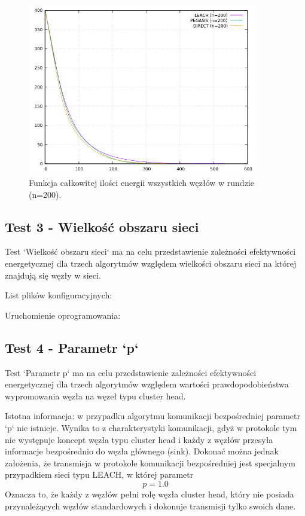 \documentclass[a4paper,12pt,twoside,openany]{report}
\begin{document}
\begin{figure}[H]
 \centering
 \includegraphics[width=10cm]{images/gnuplot/test_2/energy_in_round_200.png}
 \caption{Funkcja całkowitej ilości energii wszystkich węzłów w rundzie (n=200).}
\end{figure}

\subsection{Test 3 - Wielkość obszaru sieci}

Test `Wielkość obszaru sieci` ma na celu przedstawienie zależności efektywności energetycznej dla trzech algorytmów względem wielkości obszaru sieci na której
znajdują się węzły w sieci.

List plików konfiguracyjnych:


Uruchomienie oprogramowania:


\subsection{Test 4 - Parametr `p`}

Test `Parametr p` ma na celu przedstawienie zależności efektywności energetycznej dla trzech algorytmów względem wartości prawdopodobieństwa wypromowania węzła na węzeł
typu cluster head. 

Istotna informacja: w przypadku algorytmu komunikacji bezpośredniej parametr `p` nie istnieje. Wynika to z charakterystyki komunikacji, gdyż w protokole
tym nie występuje koncept węzła typu cluster head i każdy z węzłów przesyła informacje bezpośrednio do węzła głównego (sink). Dokonać można jednak założenia, że 
transmisja w protokole komunikacji bezpośredniej jest specjalnym przypadkiem sieci typu LEACH, w której parametr \[ p = 1.0 \]
Oznacza to, że każdy z węzłów pełni rolę węzła cluster head, który nie posiada przynależących węzłów standardowych i dokonuje transmisji tylko swoich dane.
\end{document}
